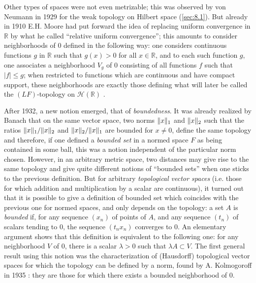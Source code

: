 \documentclass[12pt,a4paper,leqno,twoside]{extbook}
\DeclarePairedDelimiter{\norm}{\lVert}{\rVert}
\newcommand{\R}{\mathbb{R}}
\begin{document}
Other types of spaces were not even metrizable; this was observed by von Neumann in 1929 for the weak topology on Hilbert space (\ref{sec:8.1}). But already in 1910 E.H. Moore had put forward the idea of replacing uniform convergence in \(\R\) by what he called ``relative uniform convergence''; this amounts to consider neighborhoods of 0 defined in the following way: one considers continuous functions \(g\) in \(\R\) such that \(g(x) > 0\) for all \(x \in \R\), and to each such function \(g\), one associates a neighborhood \(V_g\) of 0 consisting of all functions \(f\) such that \(|f| \leq g\); when restricted to functions which are continuous and have compact support, these neighborhoods are exactly those defining what will later be called the \((LF)\)-topology on \(\mathcal{H}(\R)\) \cite{163}.

After 1932, a new notion emerged, that of \emph{boundedness}. It was already realized by Banach that on the same vector space, two norms \(\norm{x}_1\) and \(\norm{x}_2\) such that the ratios \(\norm{x}_1 / \norm{x}_2\) and \(\norm{x}_2 / \norm{x}_1\) are bounded for \(x \neq 0\), define the same topology and therefore, if one defined a \emph{bounded set} in a normed space \(F\) as being contained in some ball, this was a notion independent of the particular norm chosen. However, in an arbitrary metric space, two distances may give rise to the same topology and give quite different notions of ``bounded sets'' when one sticks to the previous definition. But for arbitrary \emph{topological vector spaces} (i.e. those for which addition and multiplication by a scalar are continuous), it turned out that it is possible to give a definition of bounded set which coincides with the previous one for normed spaces, and only depends on the topology: a set \(A\) is \emph{bounded} if, for any sequence \((x_n)\) of points of \(A\), and any sequence \((t_n)\) of scalars tending to 0, the sequence \((t_n x_n)\) converges to 0. An elementary argument shows that this definition is equivalent to the following one: for any neighborhood \(V\) of 0, there is a scalar \(\lambda > 0\) such that \(\lambda A \subset V\). The first general result using this notion was the characterization of (Hausdorff) topological vector spaces for which the topology can be defined by a norm, found by A. Kolmogoroff in 1935 \cite{130}: they are those for which there exists a bounded neighborhood of 0.
\end{document}
